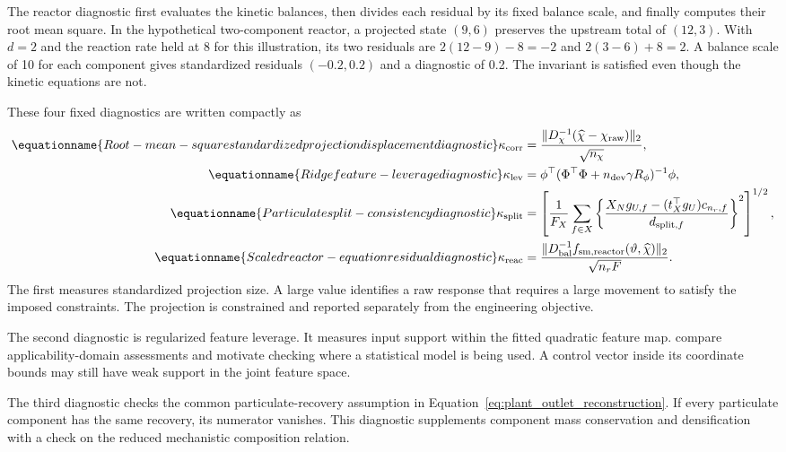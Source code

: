 The reactor diagnostic first evaluates the kinetic balances, then divides each residual by its fixed balance scale, and finally computes their root mean square. In the hypothetical two-component reactor, a projected state $(9,6)$ preserves the upstream total of $(12,3)$. With $d=2$ and the reaction rate held at 8 for this illustration, its two residuals are $2(12-9)-8=-2$ and $2(3-6)+8=2$. A balance scale of 10 for each component gives standardized residuals $(-0.2,0.2)$ and a diagnostic of 0.2. The invariant is satisfied even though the kinetic equations are not.

These four fixed diagnostics are written compactly as
\begin{align}
\equationname{Root-mean-square standardized projection displacement diagnostic}
\kappa_{\rm corr}&=\frac{\|D_\chi^{-1}(\widehat\chi-\chi_{\rm raw})\|_2}{\sqrt{n_\chi}},\\
\equationname{Ridge feature-leverage diagnostic}
\kappa_{\rm lev}&=\phi^\top(\Phi^\top\Phi+n_{\rm dev}\gamma R_\phi)^{-1}\phi,\\
\equationname{Particulate split-consistency diagnostic}
\kappa_{\rm split}&=\left[\frac1{F_X}\sum_{f\in X}
\left\{\frac{X_Ng_{U,f}-(t_X^\top g_U)c_{n_r,f}}{d_{{\rm split},f}}\right\}^2\right]^{1/2},\\
\equationname{Scaled reactor-equation residual diagnostic}
\kappa_{\rm reac}&=\frac{\|D_{\rm bal}^{-1}f_{{\rm sm},\rm reactor}(\vartheta,\widehat\chi)\|_2}{\sqrt{n_rF}}.
\label{eq:plant_trust_diagnostics}
\end{align}
The first measures standardized projection size. A large value identifies a raw response that requires a large movement to satisfy the imposed constraints. The projection is constrained and reported separately from the engineering objective.

The second diagnostic is regularized feature leverage. It measures input support within the fitted quadratic feature map. \citet{Sahigara2012} compare applicability-domain assessments and motivate checking where a statistical model is being used. A control vector inside its coordinate bounds may still have weak support in the joint feature space.

The third diagnostic checks the common particulate-recovery assumption in Equation~\eqref{eq:plant_outlet_reconstruction}. If every particulate component has the same recovery, its numerator vanishes. This diagnostic supplements component mass conservation and densification with a check on the reduced mechanistic composition relation.

